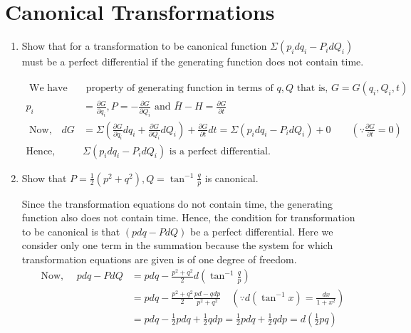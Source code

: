\section{Canonical Transformations}
\begin{enumerate}
	\item Show that for a transformation to be canonical function 
	$\Sigma\left(p_{i} d q_{i}-P_{i} d Q_{i}\right)$ must be a perfect differential if the generating function does not contain time. 
	\begin{answer}
		\begin{align*}
	\text{	We have by the }&\text{ property of generating function in terms of $q, Q$ that is, $G=G\left(q_{i}, Q_{i}, t\right)$}\\
	p_{i}&=\frac{\partial G}{\partial q_{i}}, P=-\frac{\partial G}{\partial Q_{i}}\text{ and }\bar{H}-H=\frac{\partial G}{\partial t}\\
\text{	Now,}\quad
	d G&=\Sigma\left(\frac{\partial G}{\partial q_{i}} d q_{i}+\frac{\partial G}{\partial Q_{i}} d Q_{i}\right)+\frac{\partial G}{\partial t} d t=\Sigma\left(p_{i} d q_{i}-P_{i} d Q_{i}\right)+0 \qquad\left(\because \frac{\partial G}{\partial t}=0\right)\\
	\text{Hence, }&\Sigma\left(p_{i} d q_{i}-P_{i} d Q_{i}\right)\text{ is a perfect differential.}
		\end{align*}
	\end{answer}
	\item Show that $P=\frac{1}{2}\left(p^{2}+q^{2}\right), Q=\tan ^{-1} \frac{q}{p}$ is canonical.
	\begin{answer}
		 Since the transformation equations do not contain time, the generating function also does not contain time. Hence, the condition for transformation to be canonical is that $(p d q-P d Q)$ be a perfect differential. Here we consider only one term in the summation because the system for which transformation equations are given is of one degree of freedom.
		\begin{align*}
		\text{Now, }\quad p d q-P d Q&=p d q-\frac{p^{2}+q^{2}}{2} d\left(\tan ^{-1} \frac{q}{p}\right)\\
		&=p d q-\frac{p^{2}+q^{2}}{2} \frac{p d-q d p}{p^{2}+q^{2}} \quad\left(\because d\left(\tan ^{-1} x\right)=\frac{d x}{1+x^{2}}\right)\\
		&=p d q-\frac{1}{2} p d q+\frac{1}{2} q d p=\frac{1}{2} p d q+\frac{1}{2} q d p=d\left(\frac{1}{2} p q\right)
		\end{align*}
	\end{answer}

\end{enumerate}
